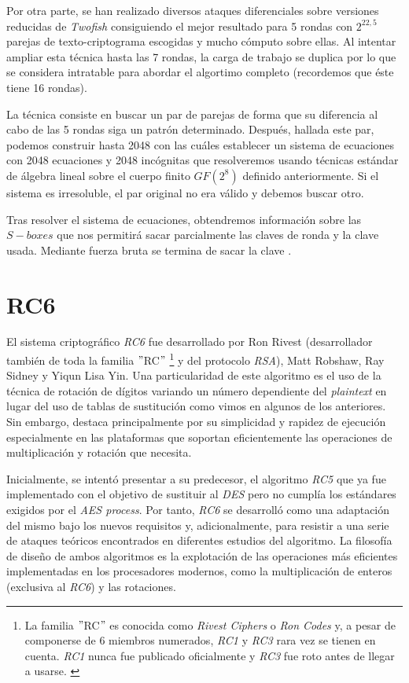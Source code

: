 Por otra parte, se han realizado diversos ataques diferenciales sobre versiones reducidas de \textit{Twofish} consiguiendo el mejor resultado para 5 rondas con $2^{22,5}$ parejas de texto-criptograma escogidas y mucho cómputo sobre ellas. Al intentar ampliar esta técnica hasta las 7 rondas, la carga de trabajo se duplica por lo que se considera intratable para abordar el algortimo completo (recordemos que éste tiene 16 rondas).

La técnica consiste en buscar un par de parejas de forma que su diferencia al cabo de las 5 rondas siga un patrón determinado. Después, hallada este par, podemos construir hasta 2048 con las cuáles establecer un sistema de ecuaciones con 2048 ecuaciones y 2048 incógnitas que resolveremos usando técnicas estándar de álgebra lineal sobre el cuerpo finito $\textit{GF}(2^8)$ definido anteriormente. Si el sistema es irresoluble, el par original no era válido y debemos buscar otro.

Tras resolver el sistema de ecuaciones, obtendremos información sobre las $S-boxes$ que nos permitirá sacar parcialmente las claves de ronda y la clave usada. Mediante fuerza bruta se termina de sacar la clave \cite{TwoFish_AES}.

\section{RC6}
\label{sec:RC6}

El sistema criptográfico \textit{RC6} fue desarrollado por Ron Rivest (desarrollador también de toda la familia $"$RC$"$ \footnote{La familia $"$RC$"$ es conocida como \textit{Rivest Ciphers} o \textit{Ron Codes} y, a pesar de componerse de 6 miembros numerados, \textit{RC1} y \textit{RC3} rara vez se tienen en cuenta. \textit{RC1} nunca fue publicado oficialmente y \textit{RC3} fue roto antes de llegar a usarse. \cite{RC6_Family}} y del protocolo \textit{RSA}), Matt Robshaw, Ray Sidney y Yiqun Lisa Yin. Una particularidad de este algoritmo es el uso de la técnica de rotación de dígitos variando un número dependiente del \textit{plaintext} en lugar del uso de tablas de sustitución como vimos en algunos de los anteriores. Sin embargo, destaca principalmente por su simplicidad y rapidez de ejecución especialmente en las plataformas que soportan eficientemente las operaciones de multiplicación y rotación que necesita. \cite{AES_Round1}

Inicialmente, se intentó presentar a su predecesor, el algoritmo \textit{RC5} que ya fue implementado con el objetivo de sustituir al \textit{DES} pero no cumplía los estándares exigidos por el \textit{AES process}. Por tanto, \textit{RC6} se desarrolló como una adaptación del mismo bajo los nuevos requisitos y, adicionalmente, para resistir a una serie de ataques teóricos encontrados en diferentes estudios del algoritmo. La filosofía de diseño de ambos algoritmos es la explotación de las operaciones más eficientes implementadas en los procesadores modernos, como la multiplicación de enteros (exclusiva al \textit{RC6}) y las rotaciones. \cite{RC6_AES}

